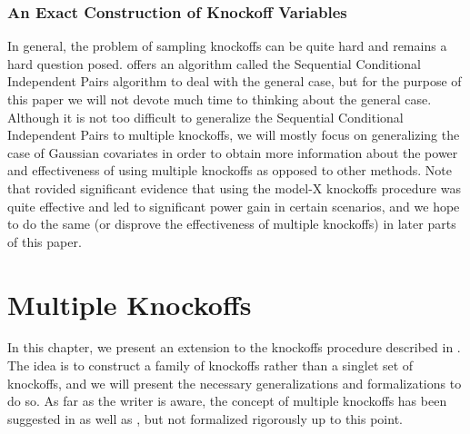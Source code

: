 \documentclass[11pt,reqno]{report}
\theoremstyle{definition}
\numberwithin{equation}{section}
\begin{document}
\subsection{An Exact Construction of Knockoff Variables}
In general, the problem of sampling knockoffs can be quite hard and remains a hard question posed. \cite{panning} offers an algorithm called the Sequential Conditional Independent Pairs algorithm to deal with the general case, but for the purpose of this paper we will not devote much time to thinking about the general case. Although it is not too difficult to generalize the Sequential Conditional Independent Pairs to multiple knockoffs, we will mostly focus on generalizing the case of Gaussian covariates in order to obtain more information about the power and effectiveness of using multiple knockoffs as opposed to other methods. Note that \cite{panning} rovided significant evidence that using the model-X knockoffs procedure was quite effective and led to significant power gain in certain scenarios, and we hope to do the same (or disprove the effectiveness of multiple knockoffs) in later parts of this paper.

\chapter{Multiple Knockoffs}
\label{chapter3}
In this chapter, we present an extension to the knockoffs procedure described in . The idea is to construct a family of knockoffs rather than a singlet set of knockoffs, and we will present the necessary generalizations and formalizations to do so. As far as the writer is aware, the concept of multiple knockoffs has been suggested in \cite{knockoffs} as well as \cite{panning}, but not formalized rigorously up to this point.
\end{document}
